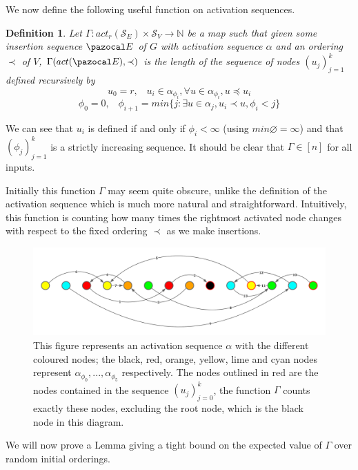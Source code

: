 \documentclass{report}
\newtheorem{definition}{Definition}
\begin{document}
We now define the following useful function on activation sequences.

\begin{definition}
Let $\Gamma : act_r(\mathcal{S}_{E}) \times \mathcal S_V \longrightarrow \mathbb{N}$ be a map such that given some insertion sequence $\pazocal E$ of $G$ with activation sequence $\alpha$ and an ordering $\prec$ of $V$, $\Gamma(act(\pazocal E), \prec)$ is the length of the sequence of nodes $(u_j)_{j=1}^k$ defined recursively by
\[ u_0 = r, \;\;\; u_i \in \alpha_{\phi_i},\forall u \in \alpha_{\phi_i}, u \preceq u_i \]
\[ \phi_0 = 0, \;\;\; \phi_{i+1} = min\{j : \exists u \in \alpha_j, u_i \prec u, \phi_i < j\}
\]
\end{definition}

We can see that $u_i$ is defined if and only if $\phi_i < \infty$ (using $min \varnothing = \infty$) and that $(\phi_j)_{j=1}^k$ is a strictly increasing sequence. It should be clear that $\Gamma \in [n]$ for all inputs.

Initially this function $\Gamma$ may seem quite obscure, unlike the definition of the activation sequence which is much more natural and straightforward. Intuitively, this function is counting how many times the rightmost activated node changes with respect to the fixed ordering $\prec$ as we make insertions.

\begin{figure}[htp]
    \centering
    \includegraphics[width=14cm]{Images/ActSeqPic.png}
    \caption{This figure represents an activation sequence $\alpha$ with the different coloured nodes; the black, red, orange, yellow, lime and cyan nodes represent $\alpha_{\phi_0},...,\alpha_{\phi_5}$ respectively. The nodes outlined in red are the nodes contained in the sequence $(u_j)_{j=0}^k$, the function $\Gamma$ counts exactly these nodes, excluding the root node, which is the black node in this diagram.}
    \label{fig:activationsequence}
\end{figure}

We will now prove a Lemma giving a tight bound on the expected value of $\Gamma$ over random initial orderings.
\end{document}
